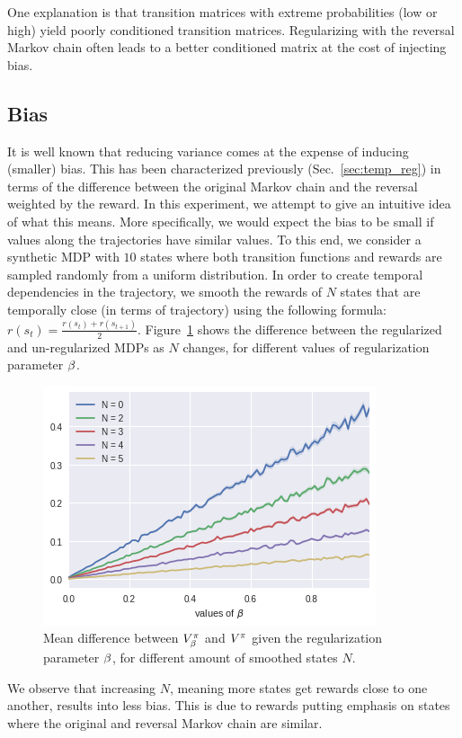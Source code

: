 One explanation is that transition matrices with extreme probabilities (low or high) yield poorly conditioned transition matrices. Regularizing with the reversal Markov chain often leads to a better conditioned matrix at the cost of injecting bias.

\subsection{Bias}
\label{sec:expe:bias}

It is well known that reducing variance comes at the expense of inducing (smaller) bias.
This has been characterized previously (Sec.~\ref{sec:temp_reg}) in terms of the difference between the original Markov chain and the reversal weighted by the reward. In this experiment, we attempt to give an intuitive idea of what this means. More specifically, we would expect the bias to be small if values along the trajectories have similar values.
To this end, we consider a synthetic MDP with $10$ states where both transition functions and rewards are sampled randomly from a uniform distribution. In order to create temporal dependencies in the trajectory, we smooth the rewards of $N$ states that are temporally close (in terms of trajectory) using the following formula: $ r(s_t) = \frac{r(s_t) + r(s_{t+1})}{2}$.
Figure~\ref{fig:mod} shows the difference between the regularized and un-regularized MDPs as $N$ changes, for different values of regularization parameter $\beta$.
\begin{figure}
    \centering
    \includegraphics[scale=0.8]{fig/mod.png}
    \caption{Mean difference between $V_{\beta}^{\pi}$ and $V^{\pi}$ given the regularization parameter $\beta$, for different amount of smoothed states $N$.}
    \label{fig:mod}
\end{figure}
We observe that increasing $N$, meaning more states get rewards close to one another, results into less bias. This is due to rewards putting emphasis on states where the original and reversal Markov chain are similar.


